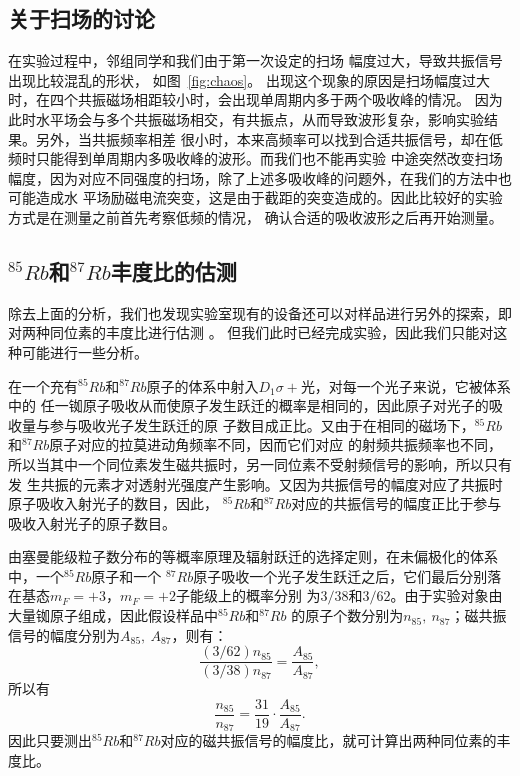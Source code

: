 \documentclass[11pt,a4paper]{article}
\begin{document}
\begin{spacing}{1.3}
\begin{CJK*}{UTF8}{gbsn}
\subsection{关于扫场的讨论}	
在实验过程中，邻组同学和我们由于第一次设定的扫场
幅度过大，导致共振信号出现比较混乱的形状，
如图~\ref{fig:chaos}。
出现这个现象的原因是扫场幅度过大时，在四个共振磁场相距较小时，会出现单周期内多于两个吸收峰的情况。
因为此时水平场会与多个共振磁场相交，有共振点，从而导致波形复杂，影响实验结果。另外，当共振频率相差
很小时，本来高频率可以找到合适共振信号，却在低频时只能得到单周期内多吸收峰的波形。而我们也不能再实验
中途突然改变扫场幅度，因为对应不同强度的扫场，除了上述多吸收峰的问题外，在我们的方法中也可能造成水
平场励磁电流突变，这是由于截距的突变造成的。因此比较好的实验方式是在测量之前首先考察低频的情况，
确认合适的吸收波形之后再开始测量。

\subsection{$^{85}Rb$和$^{87}Rb$丰度比的估测}
除去上面的分析，我们也发现实验室现有的设备还可以对样品进行另外的探索，即对两种同位素的丰度比进行估测
\cite{ref03}\cite{ref01}。
但我们此时已经完成实验，因此我们只能对这种可能进行一些分析。\par
在一个充有$^{85}Rb$和$^{87}Rb$原子的体系中射入$D_1\sigma +$光，对每一个光子来说，它被体系中的
任一铷原子吸收从而使原子发生跃迁的概率是相同的，因此原子对光子的吸收量与参与吸收光子发生跃迁的原
子数目成正比。又由于在相同的磁场下，$^{85}Rb$和$^{87}Rb$原子对应的拉莫进动角频率不同，因而它们对应
的射频共振频率也不同，所以当其中一个同位素发生磁共振时，另一同位素不受射频信号的影响，所以只有发
生共振的元素才对透射光强度产生影响。又因为共振信号的幅度对应了共振时原子吸收入射光子的数目，因此，
$^{85}Rb$和$^{87}Rb$对应的共振信号的幅度正比于参与吸收入射光子的原子数目。\par 
由塞曼能级粒子数分布的等概率原理及辐射跃迁的选择定则，在未偏极化的体系中，一个$^{85}Rb$原子和一个
$^{87}Rb$原子吸收一个光子发生跃迁之后，它们最后分别落在基态$m_F=+3$，$m_F=+2$子能级上的概率分别
为$3/38$和$3/62$\cite{ref03}。由于实验对象由大量铷原子组成，因此假设样品中$^{85}Rb$和$^{87}Rb$
的原子个数分别为$n_{85},\ n_{87}$；磁共振信号的幅度分别为$A_{85},\ A_{87}$，则有：
\begin{equation}
\frac{(3/62)n_{85}}{(3/38)n_{87}}=\frac{A_{85}}{A_{87}},
\end{equation}
所以有
\begin{equation}
\frac{n_{85}}{n_{87}}=\frac{31}{19}\cdot\frac{A_{85}}{A_{87}}.
\end{equation}
因此只要测出$^{85}Rb$和$^{87}Rb$对应的磁共振信号的幅度比，就可计算出两种同位素的丰度比\cite{ref01}。


\end{CJK*}
\end{spacing}
\end{document}
